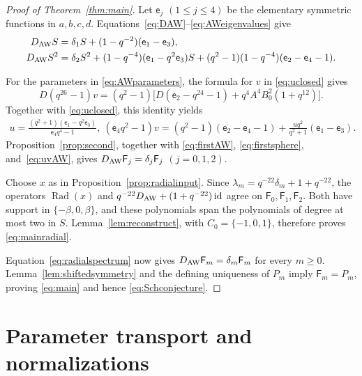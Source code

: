 \documentclass[12pt,reqno]{amsart}
\theoremstyle{plain}
\theoremstyle{definition}
\numberwithin{equation}{section}
\newcommand{\Rad}{\operatorname{Rad}}
\newcommand{\id}{\operatorname{id}}
\begin{document}
\begin{proof}[Proof of Theorem~\ref{thm:main}]
	Let $\mathsf e_j$ $(1\leq j\leq4)$ be the elementary symmetric
	functions in $a,b,c,d$. Equations~\eqref{eq:DAW}--\eqref{eq:AWeigenvalues} give
	\begin{align*}
		D_{\rm AW}S
		&=\delta_1S+(1-q^{-2})(\mathsf e_1-\mathsf e_3),\\
		D_{\rm AW}S^2
		&=\delta_2S^2
		+(1-q^{-4})(\mathsf e_1-q^2\mathsf e_3)S
		+(q^2-1)(1-q^{-4})(\mathsf e_2-\mathsf e_4-1).
	\end{align*}
	
	For the parameters in \eqref{eq:AWparameters},
	the formula for $v$ in \eqref{eq:uclosed} gives
	\[
		D(q^{26}-1)v
		=(q^2-1)\bigl[D(\mathsf e_2-q^{24}-1)
		+q^4A^4B_0^2(1+q^{12})\bigr].
	\]
	Together with \eqref{eq:uclosed}, this identity yields
	\begin{equation}\label{eq:uvAW}
\begin{aligned}
 u=\frac{(q^2+1)(\mathsf e_1-q^2\mathsf e_3)}
          {\mathsf e_4q^4-1},\ 
 (\mathsf e_4q^2-1)v
 =(q^2-1)(\mathsf e_2-\mathsf e_4-1)
   +\frac{uq^2}{q^2+1}(\mathsf e_1-\mathsf e_3).
\end{aligned}
\end{equation}
	Proposition~\ref{prop:second}, together with \eqref{eq:firstAW},
\eqref{eq:firstsphere}, and~\eqref{eq:uvAW}, gives
$D_{\rm AW}\mathsf{F}_j=\delta_j\mathsf{F}_j$ $(j=0,1,2)$.

	Choose $x$ as in Proposition~\ref{prop:radialinput}.
	Since $\lambda_m=q^{-22}\delta_m+1+q^{-22}$,
	the operators $\Rad(x)$ and
	$q^{-22}D_{\rm AW}+(1+q^{-22})\id$ agree on $\mathsf{F}_0,\mathsf{F}_1,\mathsf{F}_2$.
	Both have support in $\{-\beta,0,\beta\}$, and these polynomials
	span the polynomials of degree at most two in $S$.
	Lemma~\ref{lem:reconstruct}, with $C_0=\{-1,0,1\}$,
	therefore proves \eqref{eq:mainradial}.
	
	Equation~\eqref{eq:radialspectrum} now gives
	$D_{\rm AW}\mathsf{F}_m=\delta_m\mathsf{F}_m$ for every $m\geq0$.
	Lemma~\ref{lem:shiftedsymmetry} and the defining uniqueness
	of $P_m$ imply $\mathsf{F}_m=P_m$, proving \eqref{eq:main}
and hence \eqref{eq:Schconjecture}.
\end{proof}

\section{Parameter transport and normalizations}
\label{sec:transport}
\end{document}
